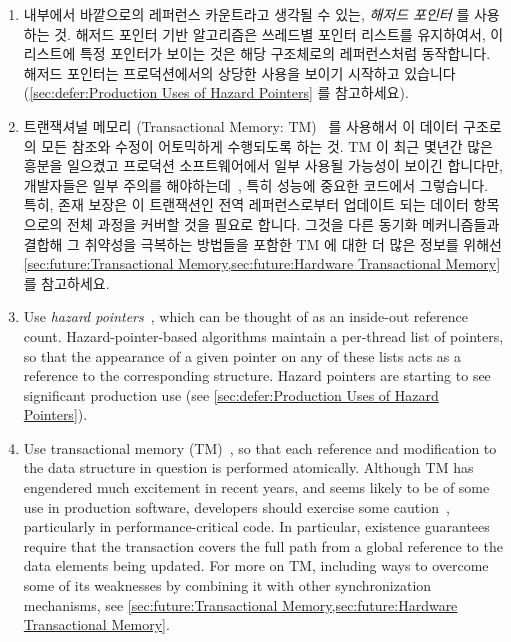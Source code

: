 {\begin{enumerate}
\begin{enumerate}
	\item	내부에서 바깥으로의 레퍼런스 카운트라고 생각될 수 있는,
		\emph{해저드 포인터} 를 사용하는 것.
		해저드 포인터 기반 알고리즘은 쓰레드별 포인터 리스트를
		유지하여서, 이 리스트에 특정 포인터가 보이는 것은 해당
		구조체로의 레퍼런스처럼 동작합니다.
		해저드 포인터는 프로덕션에서의 상당한 사용을 보이기 시작하고
		있습니다
		(\cref{sec:defer:Production Uses of Hazard Pointers} 를
		참고하세요).
	\item	트랜잭셔널 메모리 (Transactional Memory:
		TM)~\cite{Herlihy93a,DBLomet1977SIGSOFT,Shavit95} 를 사용해서
		이 데이터 구조로의 모든 참조와 수정이 어토믹하게 수행되도록
		하는 것.
		TM 이 최근 몇년간 많은 흥분을 일으켰고 프로덕션 소프트웨어에서
		일부 사용될 가능성이 보이긴 합니다만, 개발자들은 일부 주의를
		해야하는데~\cite{Blundell2005DebunkTM,Blundell2006TMdeadlock,McKenney2007PLOSTM},
		특히 성능에 중요한 코드에서 그렇습니다.
		특히, 존재 보장은 이 트랜잭션인 전역 레퍼런스로부터 업데이트
		되는 데이터 항목으로의 전체 과정을 커버할 것을 필요로 합니다.
		그것을 다른 동기화 메커니즘들과 결합해 그 취약성을 극복하는
		방법들을 포함한 TM 에 대한 더 많은 정보를 위해선
		\cref{sec:future:Transactional Memory,sec:future:Hardware
		Transactional Memory} 를 참고하세요.

	\iffalse

	\item	Use \emph{hazard pointers}~\cite{MagedMichael04a}, which
		can be thought of as an inside-out reference count.
		Hazard-pointer-based algorithms maintain a per-thread list of
		pointers, so that the appearance of a given pointer on
		any of these lists acts as a reference to the corresponding
		structure.
		Hazard pointers are starting to see significant production use
		(see \cref{sec:defer:Production Uses of Hazard Pointers}).
	\item	Use transactional memory
		(TM)~\cite{Herlihy93a,DBLomet1977SIGSOFT,Shavit95},
		so that each reference and
		modification to the data structure in question is
		performed atomically.
		Although TM has engendered much excitement in recent years,
		and seems likely to be of some use in production software,
		developers should exercise some
		caution~\cite{Blundell2005DebunkTM,Blundell2006TMdeadlock,McKenney2007PLOSTM},
		particularly in performance-critical code.
		In particular, existence guarantees require that the
		transaction covers the full path from a global reference
		to the data elements being updated.
		For more on TM, including ways to overcome some of its
		weaknesses by combining it with other synchronization
		mechanisms, see
		\cref{sec:future:Transactional Memory,sec:future:Hardware Transactional Memory}.


\end{enumerate}
\end{enumerate}}
